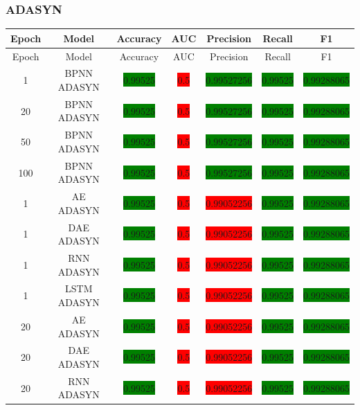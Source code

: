 \subsubsection{ADASYN}
\begin{longtable}{|c|c|c|c|c|c|c|}
	\hline
	Epoch & Model & Accuracy & AUC & Precision & Recall & F1\\ \hline
	\endfirsthead
	\hline
	Epoch & Model & Accuracy & AUC & Precision & Recall & F1\\ \hline
	\endhead
	1 & BPNN ADASYN & \colorbox{green}{0.99525} & \colorbox{red}{0.5} & \colorbox{green}{0.99527256} & \colorbox{green}{0.99525} & \colorbox{green}{0.99288065}\\ \hline
	20 & BPNN ADASYN & \colorbox{green}{0.99525} & \colorbox{red}{0.5} & \colorbox{green}{0.99527256} & \colorbox{green}{0.99525} & \colorbox{green}{0.99288065}\\ \hline
	50 & BPNN ADASYN & \colorbox{green}{0.99525} & \colorbox{red}{0.5} & \colorbox{green}{0.99527256} & \colorbox{green}{0.99525} & \colorbox{green}{0.99288065}\\ \hline
	100 & BPNN ADASYN & \colorbox{green}{0.99525} & \colorbox{red}{0.5} & \colorbox{green}{0.99527256} & \colorbox{green}{0.99525} & \colorbox{green}{0.99288065}\\ \hline
	1 & AE ADASYN & \colorbox{green}{0.99525} & \colorbox{red}{0.5} & \colorbox{red}{0.99052256} & \colorbox{green}{0.99525} & \colorbox{green}{0.99288065}\\ \hline
	1 & DAE ADASYN & \colorbox{green}{0.99525} & \colorbox{red}{0.5} & \colorbox{red}{0.99052256} & \colorbox{green}{0.99525} & \colorbox{green}{0.99288065}\\ \hline
	1 & RNN ADASYN & \colorbox{green}{0.99525} & \colorbox{red}{0.5} & \colorbox{red}{0.99052256} & \colorbox{green}{0.99525} & \colorbox{green}{0.99288065}\\ \hline
	1 & LSTM ADASYN & \colorbox{green}{0.99525} & \colorbox{red}{0.5} & \colorbox{red}{0.99052256} & \colorbox{green}{0.99525} & \colorbox{green}{0.99288065}\\ \hline
	20 & AE ADASYN & \colorbox{green}{0.99525} & \colorbox{red}{0.5} & \colorbox{red}{0.99052256} & \colorbox{green}{0.99525} & \colorbox{green}{0.99288065}\\ \hline
	20 & DAE ADASYN & \colorbox{green}{0.99525} & \colorbox{red}{0.5} & \colorbox{red}{0.99052256} & \colorbox{green}{0.99525} & \colorbox{green}{0.99288065}\\ \hline
	20 & RNN ADASYN & \colorbox{green}{0.99525} & \colorbox{red}{0.5} & \colorbox{red}{0.99052256} & \colorbox{green}{0.99525} & \colorbox{green}{0.99288065}\\ \hline

\end{longtable}
